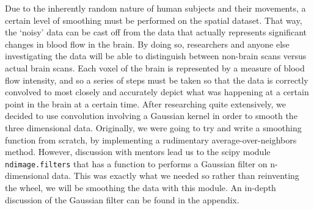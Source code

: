 \par \indent Due to the inherently random nature of human subjects and their 
movements, a certain level of smoothing must be performed on the spatial 
dataset. That way, the ‘noisy’ data can be cast off from the data that actually 
represents significant changes in blood flow in the brain. By doing so, 
researchers and anyone else investigating the data will be able to distinguish 
between non-brain scans versus actual brain scans. Each voxel of the brain is 
represented by a measure of blood flow intensity, and so a series of steps must 
be taken so that the data is correctly convolved to most closely and accurately 
depict what was happening at a certain point in the brain at a certain time. 
After researching quite extensively, we decided to use convolution involving a 
Gaussian kernel in order to smooth the three dimensional data. Originally, we 
were going to try and write a smoothing function from scratch, by implementing 
a rudimentary average-over-neighbors method. However, discussion with mentors 
lead us to the scipy module \texttt{ndimage.filters} that has a function to 
performs a Gaussian filter on n-dimensional data. This was exactly what we 
needed so rather than reinventing the wheel, we will be smoothing the data with 
this module. An in-depth discussion of the Gaussian filter can be found in the
appendix.
